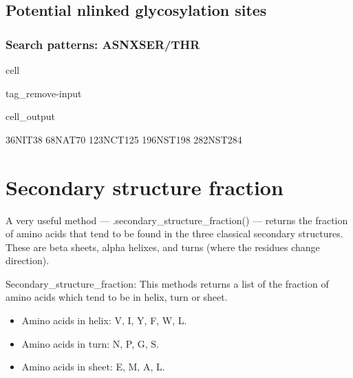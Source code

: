 \documentclass[letterpaper,10pt,english]{jupyterBook}
\begin{document}
\section{Potential n\sphinxhyphen{}linked glycosylation sites}
\label{\detokenize{ipynb/chapter2:potential-n-linked-glycosylation-sites}}

\subsection{Search patterns: ASN\sphinxhyphen{}X\sphinxhyphen{}SER/THR}
\label{\detokenize{ipynb/chapter2:search-patterns-asn-x-ser-thr}}
\begin{sphinxuseclass}{cell}
\begin{sphinxuseclass}{tag_remove-input}\begin{sphinxVerbatimOutput}

\begin{sphinxuseclass}{cell_output}
\begin{sphinxVerbatim}[commandchars=\\\{\}]
36\PYGZhy{}NIT\PYGZhy{}38
68\PYGZhy{}NAT\PYGZhy{}70
123\PYGZhy{}NCT\PYGZhy{}125
196\PYGZhy{}NST\PYGZhy{}198
282\PYGZhy{}NST\PYGZhy{}284
\end{sphinxVerbatim}

\end{sphinxuseclass}\end{sphinxVerbatimOutput}

\end{sphinxuseclass}
\end{sphinxuseclass}

\chapter{Secondary structure fraction}
\label{\detokenize{ipynb/chapter2:secondary-structure-fraction}}
\sphinxAtStartPar
A very useful method — .secondary\_structure\_fraction() — returns the fraction of amino acids that tend to be found in the three classical secondary structures. These are beta sheets, alpha helixes, and turns (where the residues change direction).

\sphinxAtStartPar
Secondary\_structure\_fraction: This methods returns a list of the fraction of amino acids which tend to be in helix, turn or sheet.
\begin{itemize}
\item {} 
\sphinxAtStartPar
Amino acids in helix: V, I, Y, F, W, L.

\item {} 
\sphinxAtStartPar
Amino acids in turn: N, P, G, S.

\item {} 
\sphinxAtStartPar
Amino acids in sheet: E, M, A, L.

\end{itemize}
\end{document}

